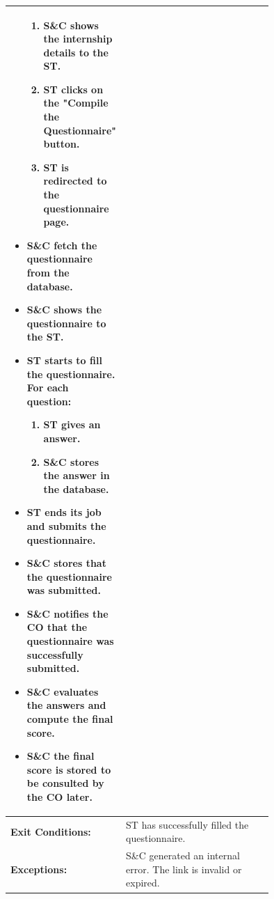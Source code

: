 \begin{center}
\begin{longtable}{|l|p{0.75\linewidth}|}
\begin{itemize}
\begin{enumerate}
                      \item S\&C shows the internship details to the ST.
                      \item ST clicks on the "Compile the Questionnaire" button.
                      \item ST is redirected to the questionnaire page.
                  \end{enumerate}
                                         \item S\&C fetch the questionnaire from the database.
                                         \item S\&C shows the questionnaire to the ST.
                                         \item ST starts to fill the questionnaire. For each question:
                                               \begin{enumerate}
                      \item ST gives an answer.
                      \item S\&C stores the answer in the database.
                  \end{enumerate}
                                         \item ST ends its job and submits the questionnaire.
                                         \item S\&C stores that the questionnaire was submitted.
                                         \item S\&C notifies the CO that the questionnaire was successfully submitted.
                                         \item S\&C evaluates the answers and compute the final score.
                                         \item S\&C the final score is stored to be consulted by the CO later.
                                     \end{itemize} \\
        \hline
        \textbf{Exit Conditions:}  & ST has successfully filled the questionnaire.                                      \\
        \hline
        \textbf{Exceptions:}       & S\&C generated an internal error. The link is invalid or expired.                  \\
        \hline
    \end{longtable}
\end{center}

